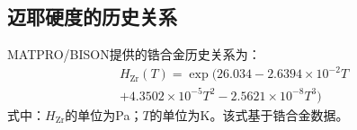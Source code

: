 \subsection{迈耶硬度的历史关系}

MATPRO/BISON提供的锆合金历史关系为\cite{hagrmanSCDAPRELAP5MOD1995,halesBISONTheoryManual2016}：
\begin{equation}
	\begin{gathered}
		H_{\mathrm{Zr}}(T)
		=\exp\!\bigl(26.034
		-2.6394\times10^{-2}T
		\\
		+4.3502\times10^{-5}T^2
		-2.5621\times10^{-8}T^3\bigr)
	\end{gathered}
	\label{eq:appendix_gap_zircaloy_meyer_hardness}
\end{equation}
\noindent 式中：$H_{\mathrm{Zr}}$的单位为Pa；$T$的单位为K。该式基于锆合金数据。


